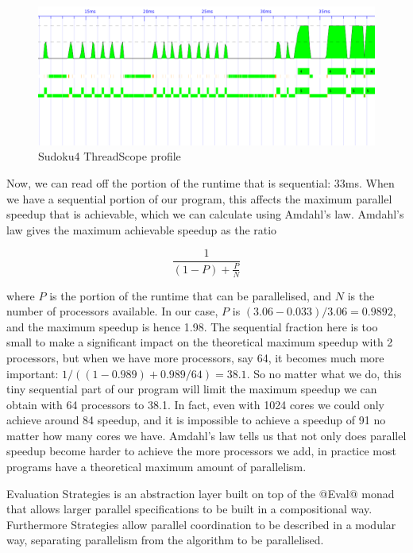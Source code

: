 \begin{figure}
\begin{center}
\includegraphics[scale=0.34]{sudoku4.png}
\end{center}
\caption{Sudoku4 ThreadScope profile}
\label{fig:sudoku4-threadscope}
\end{figure}

Now, we can read off the portion of the runtime that is sequential:
33ms.  When we have a sequential portion of our program, this affects
the maximum parallel speedup that is achievable, which we can
calculate using Amdahl's law.  Amdahl's law gives the maximum
achievable speedup as the ratio

\[
  \frac{1}{(1 - P) + \frac{P}{N}}
\]

\noindent where $P$ is the portion of the runtime that can be
parallelised, and $N$ is the number of processors available.  In our
case, $P$ is $(3.06-0.033)/3.06 = 0.9892$, and the maximum speedup is
hence 1.98.  The sequential fraction here is too small to make a
significant impact on the theoretical maximum speedup with 2
processors, but when we have more processors, say 64, it becomes much
more important: $1 / ((1-0.989) + 0.989/64) = 38.1$.  So no matter
what we do, this tiny sequential part of our program will limit the
maximum speedup we can obtain with 64 processors to 38.1.  In fact,
even with 1024 cores we could only achieve around 84 speedup, and it
is impossible to achieve a speedup of 91 no matter how many cores we
have.  Amdahl's law tells us that not only does parallel speedup
become harder to achieve the more processors we add, in practice most
programs have a theoretical maximum amount of parallelism.



Evaluation Strategies \cite{trinder:strategies,seq-no-more} is an abstraction
layer built on top of the @Eval@ monad that allows larger parallel
specifications to be built in a compositional way.  Furthermore
Strategies allow parallel coordination to be described in a modular
way, separating parallelism from the algorithm to be parallelised.

